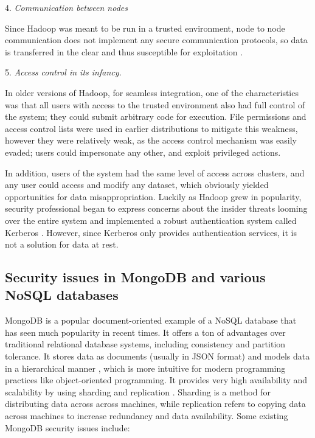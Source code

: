 \documentclass{sigchi}
\begin{document}
4. \textit{Communication between nodes}

Since Hadoop was meant to be run in a trusted environment, node to node communication does not implement any secure communication protocols, so data is transferred in the clear and thus susceptible for exploitation \cite{lakhe2014introducing}.

5. \textit{Access control in its infancy.} 

In older versions of Hadoop, for seamless integration, one of the characteristics was that all users with access to the trusted environment also had full control of the system; they could submit arbitrary code for execution. File permissions and access control lists were used in earlier distributions to mitigate this weakness, however they were relatively weak, as the access control mechanism was easily evaded; users could impersonate any other, and exploit privileged actions.

In addition, users of the system had the same level of access across clusters, and any user could access and modify any dataset, which obviously yielded opportunities for data misappropriation. Luckily as Hadoop grew in popularity, security professional began to express concerns about the insider threats looming over the entire system and implemented a robust authentication system called Kerberos \cite{o2010integrating}. However, since Kerberos only provides authentication services, it is not a solution for data at rest.

\subsection{Security issues in MongoDB and various NoSQL databases}

MongoDB is a popular document-oriented example of a NoSQL database that has seen much popularity in recent times. It offers a ton of advantages over traditional relational database systems, including consistency and partition tolerance. It stores data as documents (usually in JSON format) and models data in a hierarchical manner \cite{banker2011mongodb}, which is more intuitive for modern programming practices like object-oriented programming. It provides very high availability and scalability by using sharding and replication \cite{membrey2011definitive}. Sharding is a method for distributing data across across machines, while replication refers to copying data across machines to increase redundancy and data availability. Some existing MongoDB security issues include:
\end{document}
